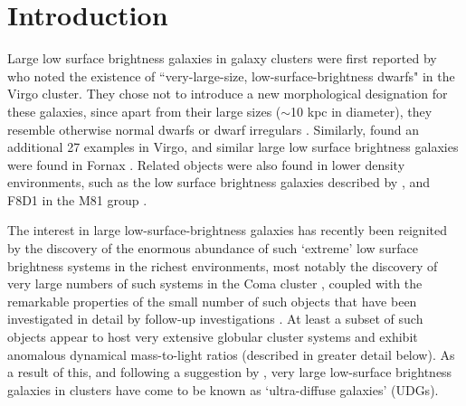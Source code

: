 \documentclass[iop,tighten,twocolumn,apj,floatfix]{emulateapj}
\begin{document}

\section{Introduction}

Large low surface brightness galaxies in galaxy clusters were first reported
by \cite{vcc3} who noted the existence of ``very-large-size,
low-surface-brightness dwarfs" in the Virgo cluster.
They chose not to introduce a new morphological designation for these
galaxies, since apart from their large sizes ($\sim$10 kpc in diameter), they
resemble otherwise normal dwarfs or dwarf irregulars \citep{vcc2}.
Similarly, \cite{impey1988} found an additional 27 examples in
Virgo, and similar large low surface brightness galaxies were found in Fornax
\citep{ferguson1988, bothun1991}.
Related objects were also found in lower density environments, such as the low
surface brightness galaxies described by \cite{dalcanton1997}, and F8D1 in the
M81 group \citep{caldwell1998}.

The interest in large low-surface-brightness galaxies has recently been
reignited by the discovery of the enormous abundance of such `extreme' low
surface brightness systems in the richest environments, most notably the
discovery of very large numbers of such systems in the Coma cluster
\citep[see][]{vandokkum2015a, koda2015}, coupled with the remarkable properties of
the small number of such objects that have been investigated in detail by
follow-up investigations \citep[e.g.][]{beasley2016a, vandokkum2016,
vandokkum2018a, danieli2019a, vandokkum2019a, martin-navarro2019}.
At least a subset of such objects appear to host very extensive globular
cluster systems and exhibit anomalous dynamical mass-to-light ratios (described
in greater detail below).
As a result of this, and following a suggestion by \cite{vandokkum2015a}, very
large low-surface brightness galaxies in clusters have come to be known as
`ultra-diffuse galaxies' (UDGs). 
\end{document}
